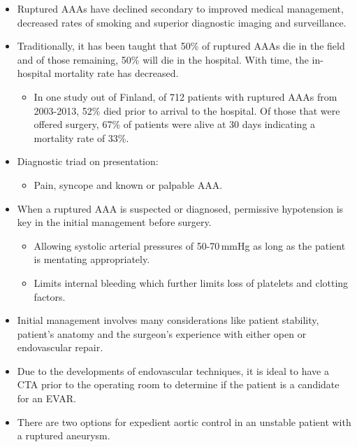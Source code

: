 \documentclass[
]{book}
\providecommand{\tightlist}{%
  \setlength{\itemsep}{0pt}\setlength{\parskip}{0pt}}
\begin{document}
\begin{itemize}
\item
  Ruptured AAAs have declined secondary to improved medical
  management, decreased rates of smoking and superior diagnostic
  imaging and surveillance.
\item
  Traditionally, it has been taught that 50\% of ruptured AAAs die in
  the field and of those remaining, 50\% will die in the hospital. With
  time, the in-hospital mortality rate has decreased.

  \begin{itemize}
  \tightlist
  \item
    In one study out of Finland, of 712 patients with ruptured AAAs
    from 2003-2013, 52\% died prior to arrival to the hospital. Of
    those that were offered surgery, 67\% of patients were alive at
    30 days indicating a mortality rate of 33\%.
    \citep{lainePopulationbasedStudyRuptured2016}
  \end{itemize}
\item
  Diagnostic triad on presentation:

  \begin{itemize}
  \tightlist
  \item
    Pain, syncope and known or palpable AAA.
  \end{itemize}
\item
  When a ruptured AAA is suspected or diagnosed, permissive
  hypotension is key in the initial management before surgery.

  \begin{itemize}
  \item
    Allowing systolic arterial pressures of 50-70\,mmHg as long as
    the patient is mentating appropriately.
  \item
    Limits internal bleeding which further limits loss of platelets
    and clotting factors.
  \end{itemize}
\item
  Initial management involves many considerations like patient
  stability, patient's anatomy and the surgeon's experience with
  either open or endovascular repair.
\item
  Due to the developments of endovascular techniques, it is ideal to
  have a CTA prior to the operating room to determine if the patient
  is a candidate for an EVAR.
\item
  There are two options for expedient aortic control in an unstable
  patient with a ruptured aneurysm.


\end{itemize}
\end{document}
